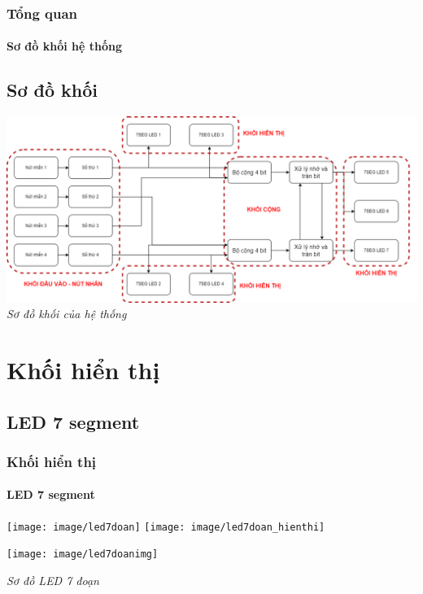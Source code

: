 \documentclass[12pt,a4paper]{beamer}
\begin{document}
\begin{frame}
	\frametitle{Tổng quan}
	\framesubtitle{Sơ đồ khối hệ thống}
	\subsection{Sơ đồ khối}
	\begin{center}
		\includegraphics[width=1\linewidth]{sodo}
		\textit{Sơ đồ khối của hệ thống}
	\end{center}
\end{frame}



\section{Khối hiển thị}
\subsection{LED 7 segment}

\begin{frame}
	\frametitle{Khối hiển thị}
	\framesubtitle{LED 7 segment}
	\begin{minipage}{6cm}
		\texttt{[image: image/led7doan]}
		\texttt{[image: image/led7doan\_hienthi]}\\
	\end{minipage}
	\hfill
	\begin{minipage}{5cm}
		\begin{center}
			\texttt{[image: image/led7doanimg]}
		\end{center}
	\end{minipage}
	\begin{center}
		\textit{Sơ đồ LED 7 đoạn}
	\end{center}
\end{frame}
\end{document}
